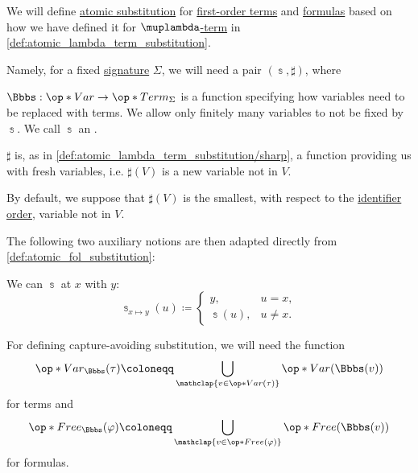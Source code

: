\begin{definition}\label{def:atomic_fol_substitution}\mimprovised
  We will define \hyperref[con:syntactic_substitution]{atomic substitution} for \hyperref[def:fol_term]{first-order terms} and \hyperref[def:fol_formula]{formulas} based on how we have defined it for \hyperref[def:lambda_term]{\( \muplambda \)-term} in \cref{def:atomic_lambda_term_substitution}.

  Namely, for a fixed \hyperref[def:fol_signature]{signature} \( \Sigma \), we will need a pair \( (\Bbbs, \sharp) \), where
  \begin{thmenum}[series=def:atomic_fol_substitution]
     \( \Bbbs: \op*{Var} \to \op*{Term}_\Sigma \) is a function specifying how variables need to be replaced with terms. We allow only finitely many variables to not be fixed by \( \Bbbs \). We call \( \Bbbs \) an .

     \( \sharp \) is, as in \cref{def:atomic_lambda_term_substitution/sharp}, a function providing us with fresh variables, i.e. \( \sharp(V) \) is a new variable not in \( V \).

    By default, we suppose that \( \sharp(V) \) is the smallest, with respect to the \hyperref[def:variable_identifier]{identifier order}, variable not in \( V \).
  \end{thmenum}

  The following two auxiliary notions are then adapted directly from \cref{def:atomic_fol_substitution}:
  \begin{thmenum}[resume=def:atomic_fol_substitution]
     We can  \( \Bbbs \) at \( x \) with \( y \):
    \begin{equation}\label{eq:def:atomic_fol_substitution/modified}
      \Bbbs_{x \mapsto y}(u) \coloneqq \begin{cases}
        y,        &u = x, \\
        \Bbbs(u), &u \neq x.
      \end{cases}
    \end{equation}

     For defining capture-avoiding substitution, we will need the function
    \begin{equation}\label{eq:def:atomic_fol_substitution/free/terms}
      \op*{Var}_\Bbbs(\tau) \coloneqq \bigcup_{\mathclap{v \in \op*{Var}(\tau)}} \op*{Var}(\Bbbs(v))
    \end{equation}
    for terms and
    \begin{equation}\label{eq:def:atomic_fol_substitution/free/formulas}
      \op*{Free}_\Bbbs(\varphi) \coloneqq \bigcup_{\mathclap{v \in \op*{Free}(\varphi)}} \op*{Free}(\Bbbs(v))
    \end{equation}
    for formulas.
  \end{thmenum}
\end{definition}

